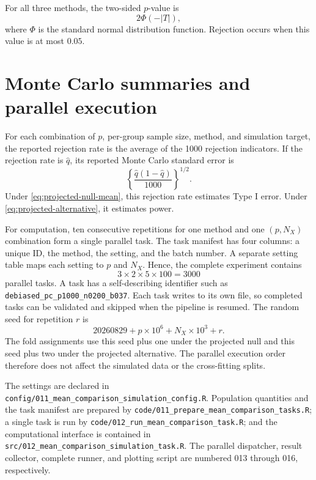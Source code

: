 \documentclass[11pt]{article}
\begin{document}
For all three methods, the two-sided $p$-value is
\[
2\Phi\left(-|T|\right),
\]
where $\Phi$ is the standard normal distribution function. Rejection occurs
when this value is at most $0.05$.


\section{Monte Carlo summaries and parallel execution}

For each combination of $p$, per-group sample size, method, and simulation
target, the reported rejection rate is the average of the 1000 rejection
indicators. If the rejection rate is $\widehat q$, its reported Monte Carlo
standard error is
\[
\left\{\frac{\widehat q(1-\widehat q)}{1000}\right\}^{1/2}.
\]
Under \eqref{eq:projected-null-mean}, this rejection rate estimates Type I
error. Under \eqref{eq:projected-alternative}, it estimates power.

For computation, ten consecutive repetitions for one method and one
$(p,N_X)$ combination form a single parallel task. The task manifest has four
columns: a unique ID, the method, the setting, and the batch number. A separate
setting table maps each setting to $p$ and $N_X$. Hence, the complete experiment
contains
\[
3\times2\times5\times100=3000
\]
parallel tasks. A task has a self-describing identifier such as
\texttt{debiased\_pc\_p1000\_n0200\_b037}. Each task writes to its own file,
so completed tasks can be validated and skipped when the pipeline is resumed.
The random seed for repetition $r$ is
\[
20260829+p\times10^6+N_X\times10^3+r.
\]
The fold assignments use this seed plus one under the projected null and this
seed plus two under the projected alternative. The parallel execution order
therefore does not affect the simulated data or the cross-fitting splits.

The settings are declared in
\texttt{config/011\_mean\_comparison\_simulation\_config.R}. Population
quantities and the task manifest are prepared by
\texttt{code/011\_prepare\_mean\_comparison\_tasks.R}; a single task is run by
\texttt{code/012\_run\_mean\_comparison\_task.R}; and the computational
interface is contained in
\texttt{src/012\_mean\_comparison\_simulation\_task.R}. The parallel
dispatcher, result collector, complete runner, and plotting script are
numbered 013 through 016, respectively.
\end{document}

